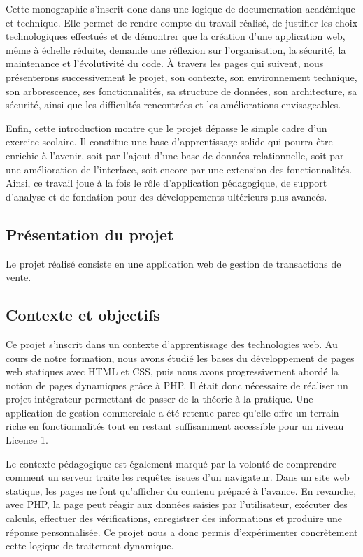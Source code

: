 \documentclass[12pt,a4paper]{article}
\begin{document}
Cette monographie s'inscrit donc dans une logique de documentation académique et technique. Elle permet de rendre compte du travail réalisé, de justifier les choix technologiques effectués et de démontrer que la création d'une application web, même à échelle réduite, demande une réflexion sur l'organisation, la sécurité, la maintenance et l'évolutivité du code. À travers les pages qui suivent, nous présenterons successivement le projet, son contexte, son environnement technique, son arborescence, ses fonctionnalités, sa structure de données, son architecture, sa sécurité, ainsi que les difficultés rencontrées et les améliorations envisageables.

Enfin, cette introduction montre que le projet dépasse le simple cadre d'un exercice scolaire. Il constitue une base d'apprentissage solide qui pourra être enrichie à l'avenir, soit par l'ajout d'une base de données relationnelle, soit par une amélioration de l'interface, soit encore par une extension des fonctionnalités. Ainsi, ce travail joue à la fois le rôle d'application pédagogique, de support d'analyse et de fondation pour des développements ultérieurs plus avancés.



\subsection{Présentation du projet}
Le projet réalisé consiste en une application web de gestion de transactions de vente.


\subsection{Contexte et objectifs}
Ce projet s'inscrit dans un contexte d'apprentissage des technologies web. Au cours de notre formation, nous avons étudié les bases du développement de pages web statiques avec HTML et CSS, puis nous avons progressivement abordé la notion de pages dynamiques grâce à PHP. Il était donc nécessaire de réaliser un projet intégrateur permettant de passer de la théorie à la pratique. Une application de gestion commerciale a été retenue parce qu'elle offre un terrain riche en fonctionnalités tout en restant suffisamment accessible pour un niveau Licence 1.

Le contexte pédagogique est également marqué par la volonté de comprendre comment un serveur traite les requêtes issues d'un navigateur. Dans un site web statique, les pages ne font qu'afficher du contenu préparé à l'avance. En revanche, avec PHP, la page peut réagir aux données saisies par l'utilisateur, exécuter des calculs, effectuer des vérifications, enregistrer des informations et produire une réponse personnalisée. Ce projet nous a donc permis d'expérimenter concrètement cette logique de traitement dynamique.
\end{document}
